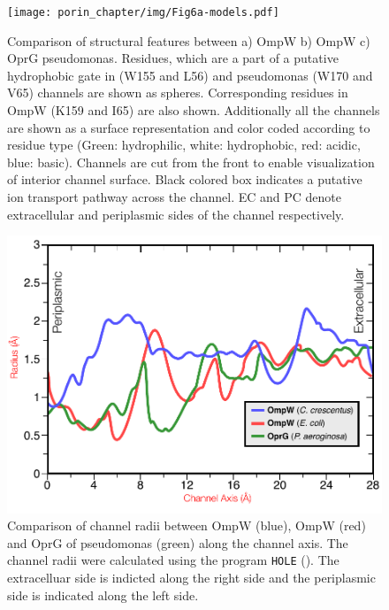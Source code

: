 \begin{figure}[htb]
  	\begin{center}
   		\texttt{[image: porin\_chapter/img/Fig6a-models.pdf]}
   	\end{center}
   	\caption[Structural properties of OmpW of \caulobacter]{
      Comparison of structural features between a) OmpW \caulobacter b) OmpW \ecoli c) OprG \ac{pseudomonas}. Residues, which are a part of a putative hydrophobic gate in \ecoli (W155 and L56) and \ac{pseudomonas} (W170 and V65) channels are shown as spheres. Corresponding residues in OmpW \caulobacter (K159 and I65) are also shown. Additionally all the channels are shown as a surface representation and color coded according to residue type (Green: hydrophilic, white: hydrophobic, red: acidic, blue: basic). Channels are cut from the front to enable visualization of interior channel surface. Black colored box indicates a putative ion transport pathway across the channel. EC and PC denote extracellular and periplasmic sides of the channel respectively.
   	}
   	\label{fig:porin-models}
\end{figure}   

\begin{figure}[htb]
  	\begin{center}
   		\includegraphics[]{porin_chapter/img/Fig6-poresizes.pdf}
   	\end{center}
   	\caption[Comparison of porin channel radii]{
Comparison of channel radii between \caulobacter OmpW (blue), \ecoli OmpW (red) and OprG of \ac{pseudomonas} (green) along the channel axis. The channel radii were calculated using the program \texttt{HOLE} (). The extracelluar side is indicted along the right side and the periplasmic side is indicated along the left side.
   	}
   	\label{fig:porin-poresizes}
\end{figure}   

